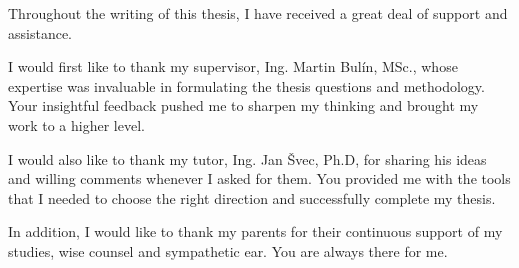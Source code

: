 
\begin{acknowledgements}
\vspace{1cm}
Throughout the writing of this thesis, I have received a great deal of support and assistance.

I would first like to thank my supervisor, Ing. Martin Bulín, MSc., whose expertise was invaluable in formulating the thesis questions and methodology. Your insightful feedback pushed me to sharpen my thinking and brought my work to a higher level.

I would also like to thank my tutor, Ing. Jan Švec, Ph.D, for sharing his ideas and willing comments whenever I asked for them. You provided me with the tools that I needed to choose the right direction and successfully complete my thesis.

In addition, I would like to thank my parents for their continuous support of my studies, wise counsel and sympathetic ear. You are always there for me.

\end{acknowledgements}